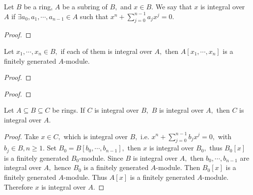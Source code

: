 \begin{Def}
Let $B$ be a ring, $A$ be a subring of $B,$ and $x\in B.$ We say
that $x$ is integral over $A$ if $\exists a_0,a_1,\cdots,a_{n-1}\in
A$ such that $x^n+\sum\limits_{j=0}^{n-1}a_jx^j=0.$
\end{Def}
\begin{proof}

\end{proof}
\begin{cor}
Let $x_1,\cdots,x_n\in B,$ if each of them is integral over $A,$
then $A[x_1,\cdots,x_n]$ is a finitely generated $A$-module.
\end{cor}
\begin{proof}

\end{proof}
\begin{proof}

\end{proof}
\begin{cor}[transitivity]
Let $A\subseteq B\subseteq C$ be rings. If $C$ is integral over $B,$
$B$ is integral over $A,$ then $C$ is integral over $A.$
\end{cor}
\begin{proof}
Take $x\in C,$ which is integral over $B,$ i.e.
$x^n+\sum\limits_{j=0}^{n-1}b_jx^j=0,$ with $b_j\in B, n\geqslant
1.$ Set $B_0=B[b_0,\cdots,b_{n-1}],$ then $x$ is integral over
$B_0,$ thus $B_0[x]$ is a finitely generated $B_0$-module. Since $B$
is integral over $A,$ then $b_0,\cdots,b_{n-1}$ are integral over
$A,$ hence $B_0$ is a finitely generated $A$-module. Then $B_0[x]$
is a finitely generated $A$-module. Thus $A[x]$ is a finitely
generated $A$-module. Therefore $x$ is integral over $A.$
\end{proof}
